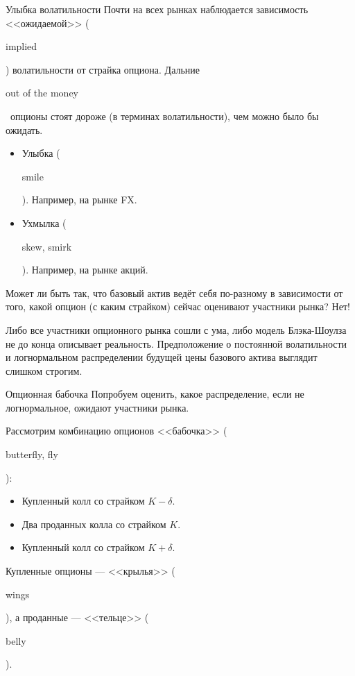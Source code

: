 \documentclass{beamer}
\newcommand{\en}[1]{\begin{otherlanguage}{english}#1\end{otherlanguage}}
\begin{document}
\begin{frame}{Улыбка волатильности}
\justify
Почти на всех рынках наблюдается зависимость <<ожидаемой>> (\en{implied}) волатильности от страйка опциона. Дальние \en{out of the money}\ опционы стоят дороже (в терминах волатильности), чем можно было бы ожидать.
\begin{itemize}
\item Улыбка (\en{smile}). Например, на рынке FX.
\item Ухмылка (\en{skew, smirk}). Например, на рынке акций.
\end{itemize}

\justify
Может ли быть так, что базовый актив ведёт себя по-разному в зависимости от того, какой опцион (с каким страйком) сейчас оценивают участники рынка? Нет!

\justify
Либо все участники опционного рынка сошли с ума, либо модель Блэка-Шоулза не до конца описывает реальность. Предположение о постоянной волатильности и логнормальном распределении будущей цены базового актива выглядит слишком строгим.
\end{frame}



\begin{frame}{Опционная бабочка}
\justify
Попробуем оценить, какое распределение, если не логнормальное, ожидают участники рынка.

\justify
Рассмотрим комбинацию опционов <<бабочка>> (\en{butterfly, fly}):
\begin{itemize}
\item Купленный колл со страйком $K - \delta$.
\item Два проданных колла со страйком $K$.
\item Купленный колл со страйком $K + \delta$.
\end{itemize}

\justify
Купленные опционы --- <<крылья>> (\en{wings}), а проданные --- <<тельце>> (\en{belly}).
\end{frame}
\end{document}

